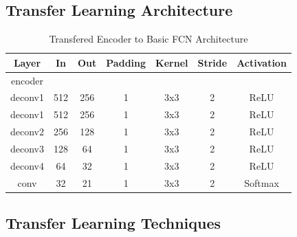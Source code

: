 \subsection*{Transfer Learning Architecture}
\begin{table}[H]
	\centering
	\label{tab:transfer}
	\setlength{\abovecaptionskip}{10pt}
	\begin{tabular}{|c|c|c|c|c|c|c|}
		\hline
		\textbf{Layer} & \textbf{In} & \textbf{Out} & \textbf{Padding} & \textbf{Kernel} & \textbf{Stride} & \textbf{Activation} \\ \hline
		encoder        &             &              &                  &                 &                 &                     \\ \hline
		deconv1        & 512         & 256          & 1                & 3x3             & 2               & ReLU                \\ \hline
		deconv1        & 512         & 256          & 1                & 3x3             & 2               & ReLU                \\ \hline
		deconv2        & 256         & 128          & 1                & 3x3             & 2               & ReLU                \\ \hline
		deconv3        & 128         & 64           & 1                & 3x3             & 2               & ReLU                \\ \hline
		deconv4        & 64          & 32           & 1                & 3x3             & 2               & ReLU                \\ \hline
		conv           & 32          & 21           & 1                & 3x3             & 2               & Softmax             \\ \hline
	\end{tabular}
	\caption{Transfered Encoder to Basic FCN Architecture}
\end{table}

\subsection*{Transfer Learning Techniques}

